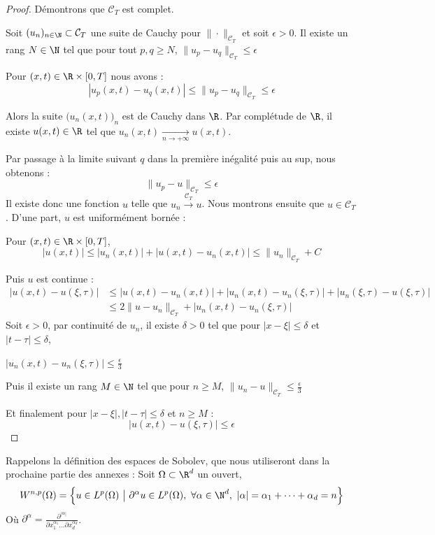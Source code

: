 \begin{proof}
    Démontrons que $\mathcal{C}_T$ est complet. 

    Soit $(u_n)_{n\in \N} \subset \mathcal{C}_T$ une suite de Cauchy pour $\| \cdot \|_{\mathcal{C}_T}$ et soit $\epsilon >0$. 
    Il existe un rang $N \in \N$ tel que pour tout $p,q \geq N$, $\|u_p - u_q\|_{\mathcal{C}_T} \leq \epsilon$

    Pour $(x,t)\in \R\times [0,T]$ nous avons :
    $$|u_p(x,t) - u_q(x,t)| \leq \|u_p - u_q\|_{\mathcal{C}_T} \leq \epsilon$$

    Alors la suite $\big(u_n(x,t)\big)_n$ est de Cauchy dans $\R$. Par complétude de $\R$, il existe $u(x,t)\in \R$ tel que $u_n(x,t) \xrightarrow[n \to +\infty]{}u(x,t)$.

    Par passage à la limite suivant $q$ dans la première inégalité puis au sup, nous obtenons :
    $$\| u_p - u \|_{\mathcal{C}_T} \leq \epsilon$$
    Il existe donc une fonction $u$ telle que $u_n \xrightarrow{\mathcal{C}_T} u $.
    Nous montrons ensuite que $u \in \mathcal{C}_T$. 
    D'une part, $u$ est uniformément bornée :

    Pour $(x,t)\in \R \times [0,T]$,
    $$|u(x,t)| \leq |u_n(x,t)| + |u(x,t) - u_n(x,t)| \leq \|u_n\|_{\mathcal{C}_T} + C$$
    
    Puis $u$ est continue :
    \begin{equation*}
    \begin{split}
        |u(x,t) - u(\xi,\tau)| &\leq |u(x,t) - u_n(x,t)| + |u_n(x,t) - u_n(\xi,\tau)| + |u_n(\xi,\tau) - u(\xi,\tau)| \\
        &\leq 2\| u - u_n \|_{\mathcal{C}_T} + |u_n(x,t) - u_n(\xi,\tau)|
    \end{split}
    \end{equation*}
    Soit $\epsilon > 0$, par continuité de $u_n$, il existe $\delta > 0$ tel que pour $|x- \xi| \leq \delta$ et $|t - \tau| \leq \delta$, 
    
    $|u_n(x,t) - u_n(\xi,\tau)| \leq \frac{\epsilon}{3}$

    Puis il existe un rang $M \in \N$ tel que pour $n \geq M$, $\|u_n - u\|_{\mathcal{C}_T} \leq \frac{\epsilon}{3}$

    Et finalement pour $|x - \xi|,|t - \tau| \leq \delta$ et $n \geq M$ :
    $$|u(x,t) - u(\xi,\tau)| \leq \epsilon$$

\end{proof}

Rappelons la définition des espaces de Sobolev, que nous utiliseront dans la prochaine partie des annexes :
Soit $\Omega \subset \R^d$ un ouvert,
$$W^{n,p}(\Omega) = \Big\{ u \in L^p(\Omega) \ \big| \ \partial^{\alpha}u \in L^p(\Omega), \ \forall \alpha \in \N^d, \ |\alpha| = \alpha_1 + \dots + \alpha_d = n \Big\}$$
Où $\partial^{\alpha} = \frac{\partial^{|\alpha|}}{\partial x_1^{\alpha_1} \dots \partial x_d^{\alpha_d}} $.

